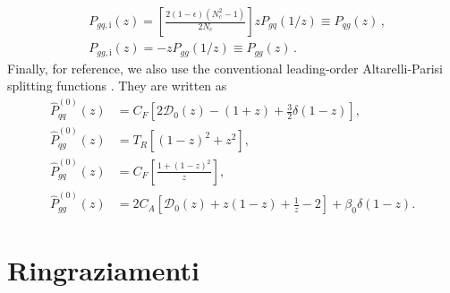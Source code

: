 \documentclass[a4paper, 12pt]{book}
\begin{document}
\begin{appendices}
\begin{equation}
\begin{split}
    & P_{gq, \mathrm{i}} (z) = \left[\frac{2(1-\epsilon)(N_c^2-1)}{2N_c}\right]z P_{gq}(1/z) \equiv P_{qg}(z) \, , \\
    & P_{gg, \mathrm{i}} (z) = -zP_{gg}(1/z) \equiv P_{gg}(z) \, .
  \end{split}
\end{equation}
Finally, for reference, we also use the conventional leading-order Altarelli-Parisi splitting functions \cite{ellis}. They are written as 
\begin{equation}
\begin{aligned}
    \hat{P}_{qq}^{(0)}(z) &= C_F \left[ 2 \mathcal{D}_0(z) - (1+z) + \frac{3}{2} \delta(1-z) \right], \\
    \hat{P}_{qg}^{(0)}(z) &= T_R \left[ (1-z)^2 + z^2 \right], \\
    \hat{P}_{gq}^{(0)}(z) &= C_F \left[ \frac{1+(1-z)^2}{z} \right], \\
    \hat{P}_{gg}^{(0)}(z) &= 2C_A \left[ \mathcal{D}_0(z) + z(1-z) + \frac{1}{z} - 2 \right] + \beta_0\delta(1-z).
\end{aligned}
\label{altarelli-parisi}
\end{equation}

\clearpage
\end{appendices}

\pagestyle{biblio}
\printbibliography[heading = bibintoc, title = {Bibliography}]

\chapter*{Ringraziamenti}
\end{document}
